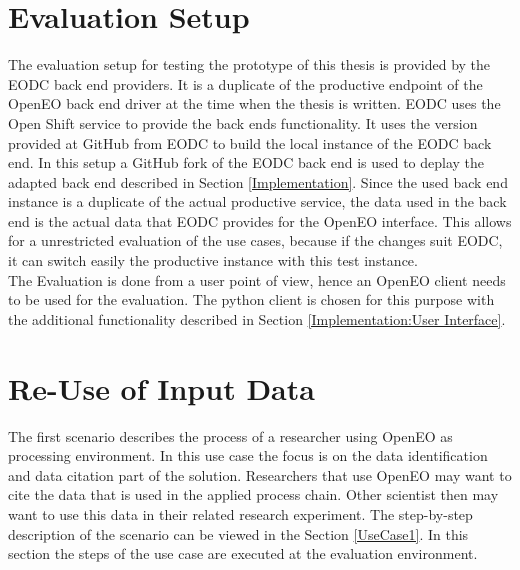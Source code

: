 \documentclass[draft,final]{vutinfth} %
\begin{document}
 \section{Evaluation Setup}\label{Evaluation:Setup}
The evaluation setup for testing the prototype of this thesis is provided by the EODC back end providers. It is a duplicate of the productive endpoint of the OpenEO back end driver at the time when the thesis is written. EODC uses the Open Shift service to provide the back ends functionality. It uses the version provided at GitHub from EODC to build the local instance of the EODC back end. In this setup a GitHub fork of the EODC back end is used to deplay the adapted back end described in Section \ref{Implementation}. Since the used back end instance is a duplicate of the actual productive service, the data used in the back end is the actual data that EODC provides for the OpenEO interface. This allows for a unrestricted evaluation of the use cases, because if the changes suit EODC, it can switch easily the productive instance with this test instance. \\
The Evaluation is done from a user point of view, hence an OpenEO client needs to be used for the evaluation. The python client is chosen for this purpose with the additional functionality described in Section \ref{Implementation:User Interface}. \\ 


\section{Re-Use of Input Data}\label{Evaluation:Use Cases}\label{Evaluation:Use Case1}
The first scenario describes the process of a researcher using OpenEO as processing environment. In this use case the focus is on the data identification and data citation part of the solution. Researchers that use OpenEO may want to cite the data that is used in the applied process chain. Other scientist then may want to use this data in their related research experiment. The step-by-step description of the scenario can be viewed in the Section \ref{UseCase1}. In this section the steps of the use case are executed at the evaluation environment.
\end{document}
